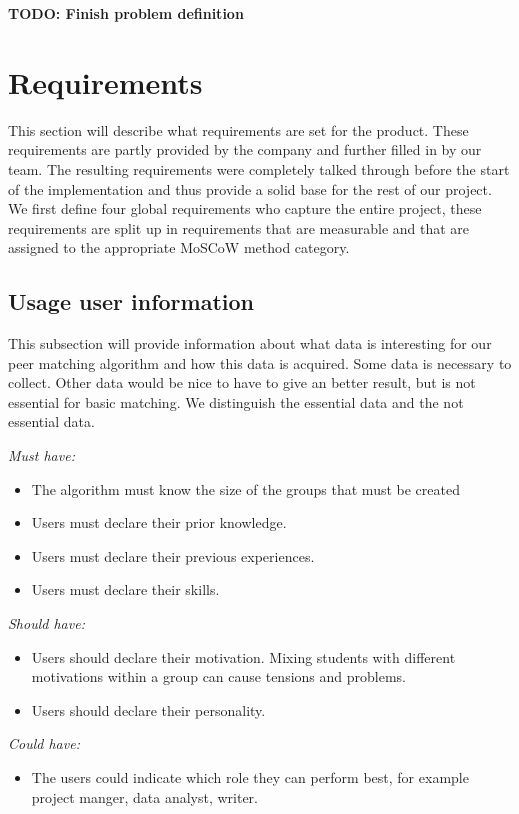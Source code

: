 \documentclass[]{article}
\newcommand{\TODO}[1]{{\color{red}\textbf{TODO: #1}}}
\begin{document}
\TODO{Finish problem definition}

\section{Requirements}
This section will describe what requirements are set for the product.
These requirements are partly provided by the company and further filled in by our team.
The resulting requirements were completely talked through before the start of the implementation and thus provide a solid base for the rest of our project.
We first define four global requirements who capture the entire project, these requirements are split up in requirements that are measurable and that are assigned to the appropriate MoSCoW\cite{highsmith2001agile} method category.

\subsection{Usage user information}
This subsection will provide information about what data is interesting for our peer matching algorithm and how this data is acquired.
Some data is necessary to collect. 
Other data would be nice to have to give an better result, but is not essential for basic matching. 
We distinguish the essential data and the not essential data.\cite{cmu}

\emph{Must have:}
\begin{itemize}
\item The algorithm must know the size of the groups that must be created
\item Users must declare their prior knowledge.
\item Users must declare their previous experiences.
\item Users must declare their skills.
\end{itemize}

\emph{Should have:}
\begin{itemize}
\item Users should declare their motivation. 
Mixing students with different motivations within a group can cause tensions and problems.
\item Users should declare their personality. 
\end{itemize}

\emph{Could have:}
\begin{itemize}
\item The users could indicate which role they can perform best, for example project manger, data analyst, writer. 
\end{itemize}
\end{document}
